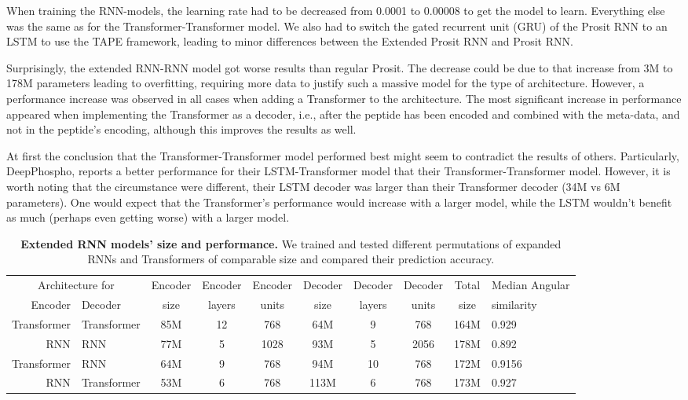 \documentclass[10pt,a4paper]{article}
\begin{document}
When training the RNN-models, the learning rate had to be decreased from 0.0001 to 0.00008 to get the model to learn. Everything else was the same as for the Transformer-Transformer model. We also had to switch the gated recurrent unit (GRU) of the Prosit RNN to an LSTM to use the TAPE framework, leading to minor differences between the Extended Prosit RNN and Prosit RNN. 

Surprisingly, the extended RNN-RNN model got worse results than regular Prosit. The decrease could be due to that increase from 3M to 178M parameters leading to overfitting, requiring more data to justify such a massive model for the type of architecture. However, a performance increase was observed in all cases when adding a Transformer to the architecture. The most significant increase in performance appeared when implementing the Transformer as a decoder, i.e., after the peptide has been encoded and combined with the meta-data, and not in the peptide's encoding, although this improves the results as well.

At first the conclusion that the Transformer-Transformer model performed best might seem to contradict the results of others. Particularly, DeepPhospho\cite{lou2021deepphospho}, reports a better performance for their LSTM-Transformer model that their Transformer-Transformer model. However, it is worth noting that the circumstance were different, their LSTM decoder was larger than their Transformer decoder (34M vs 6M parameters)\cite{lou2021deepphospho}. One would expect that the Transformer's performance would increase with a larger model, while the LSTM wouldn't benefit as much (perhaps even getting worse) with a larger model.

\begin{table}[htbp]
    \caption{{\bf Extended RNN models' size and performance.} We trained and tested different permutations of expanded RNNs and Transformers of comparable size and compared their prediction accuracy.}
      \begin{tabular}{r@{-}l|cccccccl}
      \hline
      \multicolumn{2}{c|}{Architecture for} & Encoder & Encoder & Encoder & Decoder & Decoder & Decoder & Total & Median Angular \\
      Encoder   & Decoder    & size    & layers & units & size    & layers & units   & size  & similarity \\
      \hline
      Transformer & Transformer & 85M   & 12 & 768 & 64M   & 9 & 768 & 164M  & 0.929 \\
      RNN & RNN & 77M   & 5 & 1028 & 93M   & 5 & 2056 & 178M  & 0.892 \\
      Transformer & RNN & 64M  & 9 & 768 & 94M   & 10 & 768  & 172M  & 0.9156 \\
      RNN & Transformer & 53M   & 6 & 768 & 113M   & 6 & 768  & 173M  & 0.927 \\
      \hline
      \end{tabular}%
    \label{tab:architecture}%
  \end{table}%
\end{document}
